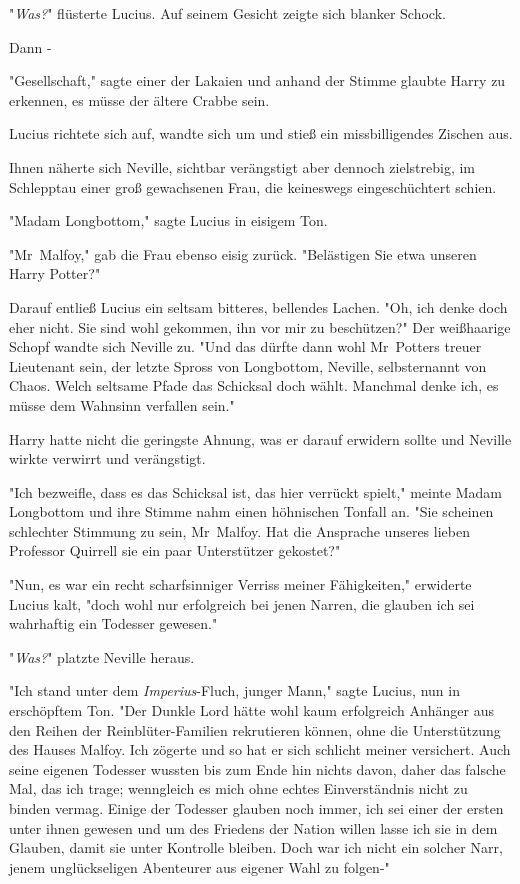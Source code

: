 {"\emph{Was?}" flüsterte Lucius. Auf seinem Gesicht zeigte sich blanker Schock.

Dann -

"Gesellschaft," sagte einer der Lakaien und anhand der Stimme glaubte Harry zu erkennen, es müsse der ältere Crabbe sein.

Lucius richtete sich auf, wandte sich um und stieß ein missbilligendes Zischen aus.

Ihnen näherte sich Neville, sichtbar verängstigt aber dennoch zielstrebig, im Schlepptau einer groß gewachsenen Frau, die keineswegs eingeschüchtert schien.

"Madam Longbottom," sagte Lucius in eisigem Ton.

"Mr~Malfoy," gab die Frau ebenso eisig zurück. "Belästigen Sie etwa unseren Harry Potter?"

Darauf entließ Lucius ein seltsam bitteres, bellendes Lachen. "Oh, ich denke doch eher nicht. Sie sind wohl gekommen, ihn vor mir zu beschützen?" Der weißhaarige Schopf wandte sich Neville zu. "Und das dürfte dann wohl Mr~Potters treuer Lieutenant sein, der letzte Spross von Longbottom, Neville, selbsternannt von Chaos. Welch seltsame Pfade das Schicksal doch wählt. Manchmal denke ich, es müsse dem Wahnsinn verfallen sein."

Harry hatte nicht die geringste Ahnung, was er darauf erwidern sollte und Neville wirkte verwirrt und verängstigt.

"Ich bezweifle, dass es das Schicksal ist, das hier verrückt spielt," meinte Madam Longbottom und ihre Stimme nahm einen höhnischen Tonfall an. "Sie scheinen schlechter Stimmung zu sein, Mr~Malfoy. Hat die Ansprache unseres lieben Professor Quirrell sie ein paar Unterstützer gekostet?"

"Nun, es war ein recht scharfsinniger Verriss meiner Fähigkeiten," erwiderte Lucius kalt, "doch wohl nur erfolgreich bei jenen Narren, die glauben ich sei wahrhaftig ein Todesser gewesen."

"\emph{Was?}" platzte Neville heraus.

"Ich stand unter dem \emph{Imperius}-Fluch, junger Mann," sagte Lucius, nun in erschöpftem Ton. "Der Dunkle Lord hätte wohl kaum erfolgreich Anhänger aus den Reihen der Reinblüter-Familien rekrutieren können, ohne die Unterstützung des Hauses Malfoy. Ich zögerte und so hat er sich schlicht meiner versichert. Auch seine eigenen Todesser wussten bis zum Ende hin nichts davon, daher das falsche Mal, das ich trage; wenngleich es mich ohne echtes Einverständnis nicht zu binden vermag. Einige der Todesser glauben noch immer, ich sei einer der ersten unter ihnen gewesen und um des Friedens der Nation willen lasse ich sie in dem Glauben, damit sie unter Kontrolle bleiben. Doch war ich nicht ein solcher Narr, jenem unglückseligen Abenteurer aus eigener Wahl zu folgen-"

}
